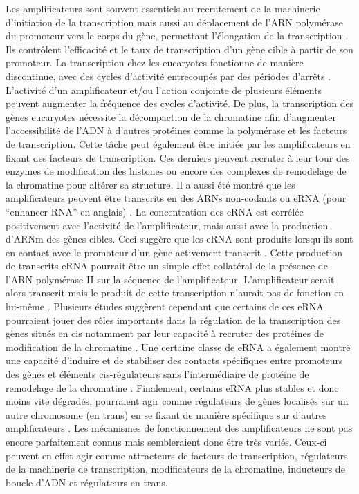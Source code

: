 Les \glspl{amplificateur} sont souvent essentiels au recrutement de la machinerie d’initiation de la transcription mais aussi au déplacement de l’ARN polymérase du promoteur vers le corps du gène, permettant l’élongation de la transcription \citep{zippo_histone_2009}. Ils contrôlent l’efficacité et le taux de transcription d’un gène cible à partir de son promoteur. La transcription chez les eucaryotes fonctionne de manière discontinue, avec des cycles d’activité entrecoupés par des périodes d’arrêts \citep{chubb_transcriptional_2006, raj_stochastic_2006}. L’activité d’un \gls{amplificateur} et/ou l’action conjointe de plusieurs éléments peuvent augmenter la fréquence des cycles d’activité. De plus, la transcription des gènes eucaryotes nécessite la décompaction de la chromatine afin d’augmenter l’accessibilité de l’ADN à d’autres protéines comme la polymérase et les facteurs de transcription. Cette tâche peut également être initiée par les \glspl{amplificateur} en fixant des facteurs de transcription. Ces derniers peuvent recruter à leur tour des enzymes de modification des histones ou encore des complexes de remodelage de la chromatine pour altérer sa structure. Il a aussi été montré que les \glspl{amplificateur} peuvent être transcrits en des \acrshort{ARN}s non-codants ou \acrshort{eRNA} (pour “enhancer-RNA” en anglais) \citep{santa_large_2010}. La concentration des \acrshort{eRNA} est corrélée positivement avec l’activité de l’\gls{amplificateur}, mais aussi avec la production d’\acrshort{ARNm} des gènes cibles. Ceci suggère que les \acrshort{eRNA} sont produits lorsqu’ils sont en contact avec le promoteur d’un gène activement transcrit \citep{cheng_genome-wide_2015}. Cette production de transcrits \acrshort{eRNA} pourrait être un simple effet collatéral de la présence de l’ARN polymérase II sur la séquence de l’\gls{amplificateur}. L’\gls{amplificateur} serait alors transcrit mais le produit de cette transcription n’aurait pas de fonction en lui-même \citep{struhl_transcriptional_2007}. Plusieurs études suggèrent cependant que certains de ces \acrshort{eRNA} pourraient jouer des rôles importants dans la régulation de la transcription des gènes situés en cis notamment par leur capacité à recruter des protéines de modification de la chromatine \citep{wang_reprogramming_2011, arnold_diversity_2020}. Une certaine classe de \acrshort{eRNA} a également montré une capacité d’induire et de stabiliser des contacts spécifiques entre promoteurs des gènes et éléments \gls{cis}-régulateurs sans l’intermédiaire de protéine de remodelage de la chromatine \citep{wang_reprogramming_2011}. Finalement, certains \acrshort{eRNA} plus stables et donc moins vite dégradés, pourraient agir comme régulateurs de gènes localisés sur un autre chromosome (en trans) en se fixant de manière spécifique sur d’autres \glspl{amplificateur} \citep{cajigas_evf2_2018}. Les mécanismes de fonctionnement des \glspl{amplificateur}  ne sont pas encore parfaitement connus mais sembleraient donc être très variés. Ceux-ci peuvent en effet agir comme attracteurs de facteurs de transcription, régulateurs de la machinerie de transcription, modificateurs de la chromatine, inducteurs de boucle d’ADN et régulateurs en trans.

